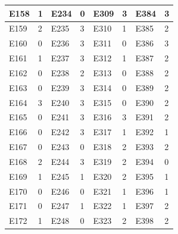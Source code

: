 \documentclass[UTF8]{ctexart}
\begin{document}
\begin{table}[H]
\begin{tabular}{|l|l|l|l|l|l|l|l|}
					E158 & 1 & E234 & 0 & E309 & 3 & E384 & 3 \\ \hline
					E159 & 2 & E235 & 3 & E310 & 1 & E385 & 2 \\ \hline
					E160 & 0 & E236 & 3 & E311 & 0 & E386 & 3 \\ \hline
					E161 & 1 & E237 & 3 & E312 & 1 & E387 & 2 \\ \hline
					E162 & 0 & E238 & 2 & E313 & 0 & E388 & 2 \\ \hline
					E163 & 0 & E239 & 3 & E314 & 0 & E389 & 2 \\ \hline
					E164 & 3 & E240 & 3 & E315 & 0 & E390 & 2 \\ \hline
					E165 & 0 & E241 & 3 & E316 & 3 & E391 & 2 \\ \hline
					E166 & 0 & E242 & 3 & E317 & 1 & E392 & 1 \\ \hline
					E167 & 0 & E243 & 0 & E318 & 2 & E393 & 2 \\ \hline
					E168 & 2 & E244 & 3 & E319 & 2 & E394 & 0 \\ \hline
					E169 & 1 & E245 & 1 & E320 & 2 & E395 & 1 \\ \hline
					E170 & 0 & E246 & 0 & E321 & 1 & E396 & 1 \\ \hline
					E171 & 0 & E247 & 1 & E322 & 1 & E397 & 2 \\ \hline
					E172 & 1 & E248 & 0 & E323 & 2 & E398 & 2 \\ \hline
				\end{tabular}
			\end{table}
		
\end{document}
